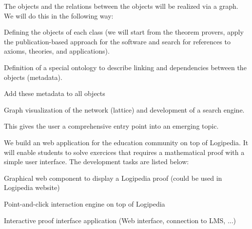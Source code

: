 \begin{workpackage}[id=dissemination,type=MGT,
  short={Dissemination},
  title={Dissemination, communication and exploitation},
  lead=Inr,InrRM=12,BirRM=4,IrtRM=4,ImtRM=2,StrRM=2,ZibRM=14,EduRM=12]
\begin{tasklist}
\begin{task}[id=zib,
      title=Linking scientific publications to Logipedia,
      lead=Zib,ZibRM=12,wphases=12-23]
    The objects and the relations between the objects will be
    realized via a graph. We will do this in the following way:
    \begin{compactitem}
    \item Defining the objects of each class (we will start from the
      theorem provers, apply the publication-based approach for the
      software and search for references to axioms, theories, and
      applications).
    \item Definition of a special ontology to describe linking and
      dependencies between the objects (metadata).
    \item Add these metadata to all objects
    \item Graph visualization of the network (lattice) and development
      of a search engine.
    \end{compactitem}
    This gives the user a comprehensive entry point into an emerging
    topic.
  \end{task}

  \begin{task}[id=edukera,
      title=Web interface for doing proofs at school,
      lead=Edu,EduRM=12,wphases=12-23]
    We build an web application for the education community on top of Logipedia. It will enable students to solve exercices that requires a mathematical proof with a simple user interface.
    The development tasks are listed below:
    \begin{compactitem}
    \item Graphical web component to display a Logipedia proof (could be used in Logipedia website)
    \item Point-and-click interaction engine on top of Logipedia
    \item Interactive proof interface application (Web interface, connection to LMS, ...)
    \end{compactitem}
  \end{task}

\end{tasklist}

\begin{wpdelivs}



\end{wpdelivs}
\end{workpackage}
